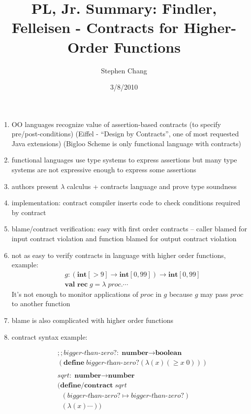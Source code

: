 \documentclass[12pt]{article}	%
\newcommand{\keyw}[1]{ \ensuremath{ \textbf{#1} } }
\newcommand{\integer}{ \keyw{int} }
\newcommand{\num}{ \keyw{number} }
\newcommand{\bool}{ \keyw{boolean} }
\newcommand{\numnum}{ \ensuremath{ \num\rightarrow\num } }
\newcommand{\numbool}{ \ensuremath{ \num\rightarrow\bool } }
\newcommand{\define}{ \keyw{define} }
\newcommand{\defcontract}{ \keyw{define/contract} }
\newcommand{\contract}{ \ensuremath{ \longmapsto } }
\begin{document}
\title{PL, Jr. Summary: Findler, Felleisen - Contracts for Higher-Order Functions}
\author{Stephen Chang}
\date{3/8/2010}
\maketitle

\begin{enumerate}
	\item OO languages recognize value of assertion-based contracts (to specify pre/post-conditions) (Eiffel - ``Design by Contracts'', one of most requested Java extensions) (Bigloo Scheme is only functional language with contracts)
	\item functional languages use type systems to express assertions but many type systems are not expressive enough to express some assertions
	\item authors present $\lambda$ calculus + contracts language and prove type soundness
	\item implementation: contract compiler inserts code to check conditions required by contract
	\item blame/contract verification: easy with first order contracts -- caller blamed for input contract violation and function blamed for output contract violation
	\item not as easy to verify contracts in language with higher order functions, example:
\begin{align*}
& g:(\integer[>9]\rightarrow\integer[0,99])\rightarrow\integer[0,99] \\
& \keyw{val rec} \; g = \lambda \; proc.\cdots	
\end{align*}
	It's not enough to monitor applications of $proc$ in $g$ because $g$ may pass $proc$ to another function
	\item blame is also complicated with higher order functions
	\item contract syntax example:
	
\newcommand{\biggerthanzero}{ \textit{bigger-than-zero?} }

\begin{align*}
& ;; \biggerthanzero : \numbool \\
& (\define \; \biggerthanzero (\lambda (x) (\geq x \; 0))) \\
& \\
& \textit{sqrt} : \numnum \\
& (\defcontract \; sqrt \\
& \;\;(\biggerthanzero \contract \biggerthanzero) \\
& \;\;(\lambda (x) \cdots))
\end{align*}


\end{enumerate}
\end{document}
